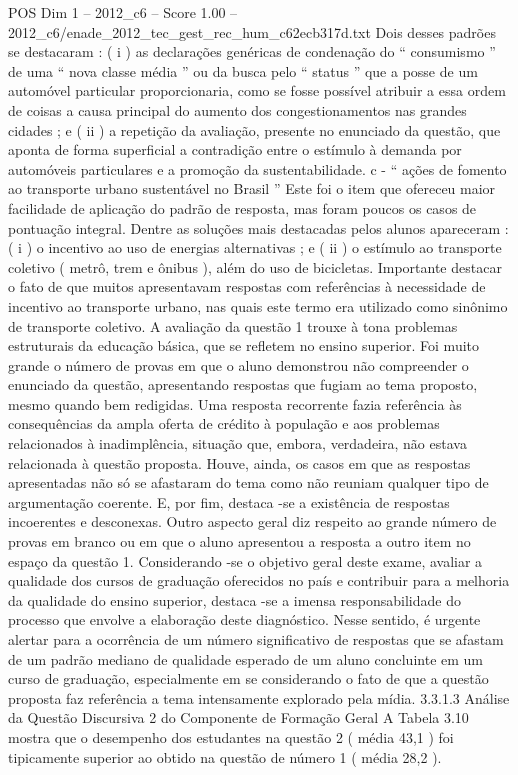 \begin{textsample}{POS Dim 1 – 2012\_c6 – Score 1.00 – 2012\_c6/enade\_2012\_tec\_gest\_rec\_hum\_c62ecb317d.txt}
Dois desses padrões se destacaram : ( i ) as declarações genéricas de condenação do “ consumismo ” de uma “ nova classe média ” ou da busca pelo “ status ” que a posse de um automóvel particular proporcionaria, como se fosse possível atribuir a essa ordem de coisas a causa principal do aumento dos congestionamentos nas grandes cidades ; e ( ii ) a repetição da avaliação, presente no enunciado da questão, que aponta de forma superficial a contradição entre o estímulo à demanda por automóveis particulares e a promoção da sustentabilidade. c - “ ações de fomento ao transporte urbano sustentável no Brasil ” Este foi o item que ofereceu maior facilidade de aplicação do padrão de resposta, mas foram poucos os casos de pontuação integral.
Dentre as soluções mais destacadas pelos alunos apareceram : ( i ) o incentivo ao uso de energias alternativas ; e ( ii ) o estímulo ao transporte coletivo ( metrô, trem e ônibus ), além do uso de bicicletas.
Importante destacar o fato de que muitos apresentavam respostas com referências à necessidade de incentivo ao transporte urbano, nas quais este termo era utilizado como sinônimo de transporte coletivo.
A avaliação da questão 1 trouxe à tona problemas estruturais da educação básica, que se refletem no ensino superior.
Foi muito grande o número de provas em que o aluno demonstrou não compreender o enunciado da questão, apresentando respostas que fugiam ao tema proposto, mesmo quando bem redigidas.
Uma resposta recorrente fazia referência às consequências da ampla oferta de crédito à população e aos problemas relacionados à inadimplência, situação que, embora, verdadeira, não estava relacionada à questão proposta.
Houve, ainda, os casos em que as respostas apresentadas não só se afastaram do tema como não reuniam qualquer tipo de argumentação coerente.
E, por fim, destaca -se a existência de respostas incoerentes e desconexas.
Outro aspecto geral diz respeito ao grande número de provas em branco ou em que o aluno apresentou a resposta a outro item no espaço da questão 1.
Considerando -se o objetivo geral deste exame, avaliar a qualidade dos cursos de graduação oferecidos no país e contribuir para a melhoria da qualidade do ensino superior, destaca -se a imensa responsabilidade do processo que envolve a elaboração deste diagnóstico.
Nesse sentido, é urgente alertar para a ocorrência de um número significativo de respostas que se afastam de um padrão mediano de qualidade esperado de um aluno concluinte em um curso de graduação, especialmente em se considerando o fato de que a questão proposta faz referência a tema intensamente explorado pela mídia. 3.3.1.3 Análise da Questão Discursiva 2 do Componente de Formação Geral A Tabela 3.10 mostra que o desempenho dos estudantes na questão 2 ( média 43,1 ) foi tipicamente superior ao obtido na questão de número 1 ( média 28,2 ).

\end{textsample}
